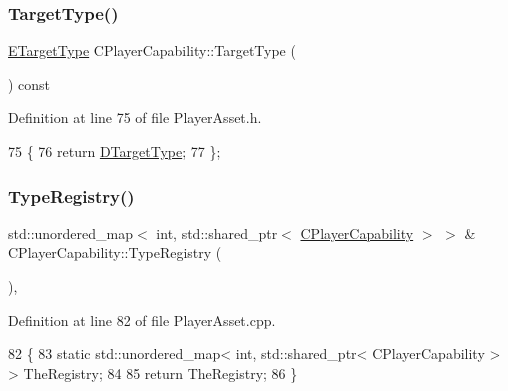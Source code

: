 \subsubsection{\texorpdfstring{Target\+Type()}{TargetType()}}
{\footnotesize\ttfamily \hyperlink{classCPlayerCapability_a9d3450ed1532fd536bd6cbb1e2eef02f}{E\+Target\+Type} C\+Player\+Capability\+::\+Target\+Type (\begin{DoxyParamCaption}{ }\end{DoxyParamCaption}) const\hspace{0.3cm}{\ttfamily [inline]}}



Definition at line 75 of file Player\+Asset.\+h.


\begin{DoxyCode}
75                                       \{
76             \textcolor{keywordflow}{return} \hyperlink{classCPlayerCapability_af3e2c3d386fbdce314d36e3e16ee823c}{DTargetType};   
77         \};
\end{DoxyCode}
\hypertarget{classCPlayerCapability_ab7fee932703792663278b1b2128f00f3}{}\label{classCPlayerCapability_ab7fee932703792663278b1b2128f00f3} 
\subsubsection{\texorpdfstring{Type\+Registry()}{TypeRegistry()}}
{\footnotesize\ttfamily std\+::unordered\+\_\+map$<$ int, std\+::shared\+\_\+ptr$<$ \hyperlink{classCPlayerCapability}{C\+Player\+Capability} $>$ $>$ \& C\+Player\+Capability\+::\+Type\+Registry (\begin{DoxyParamCaption}{ }\end{DoxyParamCaption})\hspace{0.3cm}{\ttfamily [static]}, {\ttfamily [protected]}}



Definition at line 82 of file Player\+Asset.\+cpp.


\begin{DoxyCode}
82                                                                                             \{
83     \textcolor{keyword}{static} std::unordered\_map< int, std::shared\_ptr< CPlayerCapability > > TheRegistry;
84     
85     \textcolor{keywordflow}{return} TheRegistry;
86 \}
\end{DoxyCode}
\hypertarget{classCPlayerCapability_a976f05b7e620b721bdb5051debc9b93d}{}\label{classCPlayerCapability_a976f05b7e620b721bdb5051debc9b93d} 

